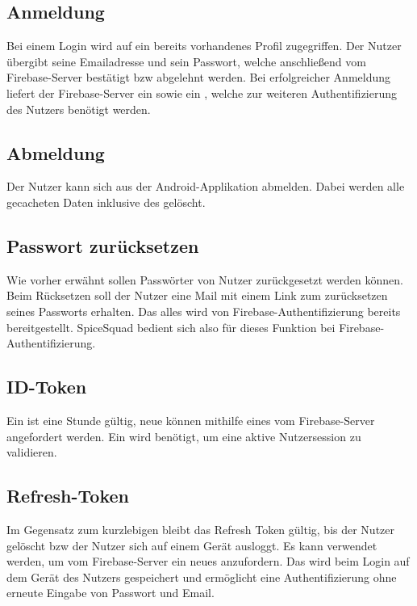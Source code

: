 \documentclass{entwurfsheft}
\begin{document}
\begin{sloppypar}
\subsection{Anmeldung}
Bei einem Login wird auf ein bereits vorhandenes Profil zugegriffen. Der Nutzer übergibt seine Emailadresse und sein Passwort, welche anschließend vom Firebase-Server bestätigt bzw abgelehnt werden. Bei erfolgreicher Anmeldung liefert der Firebase-Server ein  sowie ein , welche zur weiteren Authentifizierung des Nutzers benötigt werden.

\subsection{Abmeldung}
Der Nutzer kann sich aus der Android-Applikation abmelden. Dabei werden alle gecacheten Daten inklusive des  gelöscht.

\subsection{Passwort zurücksetzen}
Wie vorher erwähnt sollen Passwörter von Nutzer zurückgesetzt werden können. Beim Rücksetzen soll der Nutzer eine Mail mit einem Link zum zurücksetzen seines Passworts erhalten.
Das alles wird von Firebase-Authentifizierung bereits bereitgestellt. SpiceSquad bedient sich also für dieses Funktion bei Firebase-Authentifizierung.

\subsection{ID-Token}
Ein  ist eine Stunde gültig, neue  können mithilfe eines  vom Firebase-Server angefordert werden. Ein  wird benötigt, um eine aktive Nutzersession zu validieren.

\subsection{Refresh-Token}
Im Gegensatz zum kurzlebigen  bleibt das Refresh Token gültig, bis der Nutzer gelöscht bzw der Nutzer sich auf einem Gerät ausloggt. Es kann verwendet werden, um vom Firebase-Server ein neues  anzufordern. Das  wird beim Login auf dem Gerät des Nutzers gespeichert und ermöglicht eine Authentifizierung ohne erneute Eingabe von Passwort und Email. 


\end{sloppypar}
\end{document}
